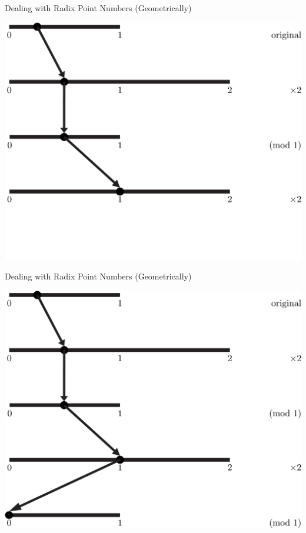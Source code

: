 \documentclass{beamer}
\begin{document}
        \begin{frame}{Dealing with Radix Point Numbers (Geometrically)}
          \begin{example}
            \includegraphics[width=\textwidth,height=0.75\textheight]{images/Binary/4}
          \end{example}
        \end{frame}

        \begin{frame}{Dealing with Radix Point Numbers (Geometrically)}
          \begin{example}
            \includegraphics[width=\textwidth,height=0.75\textheight]{images/Binary/5}
          \end{example}
        \end{frame}
\end{document}
